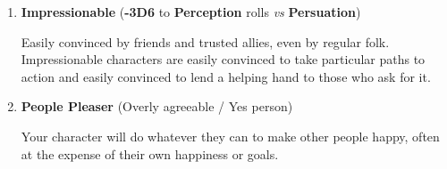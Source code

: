 \begin{enumerate}
    \item \textbf{Impressionable} (\textbf{-3D6} to \textbf{Perception} rolls \textit{vs} \textbf{Persuation})
    
    Easily convinced by friends and trusted allies, even by regular folk. Impressionable characters are easily convinced to take particular paths to action and easily convinced to lend a helping hand to those who ask for it.

    \item \textbf{People Pleaser} (Overly agreeable / Yes person)
    
    Your character will do whatever they can to make other people happy, often at the expense of their own happiness or goals.
\end{enumerate}
